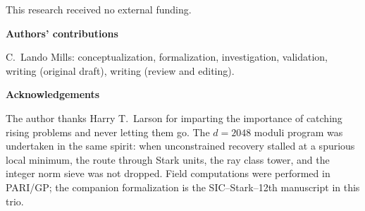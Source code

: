 \documentclass[12pt,a4paper]{article}
\begin{document}
\noindent
This research received no external funding.

\vspace{1em}

\noindent\textbf{Authors' contributions}

\noindent
C.\ Lando Mills: conceptualization, formalization, investigation, validation,
writing (original draft), writing (review and editing).

\vspace{1em}

\noindent\textbf{Acknowledgements}

\noindent
The author thanks Harry T.\ Larson for imparting the importance of catching rising
problems and never letting them go.
The $d=2048$ moduli program was undertaken in the same spirit: when unconstrained
recovery stalled at a spurious local minimum, the route through Stark units, the ray
class tower, and the integer norm sieve was not dropped.
Field computations were performed in PARI/GP; the companion formalization is the
SIC--Stark--12th manuscript in this trio.
\end{document}
